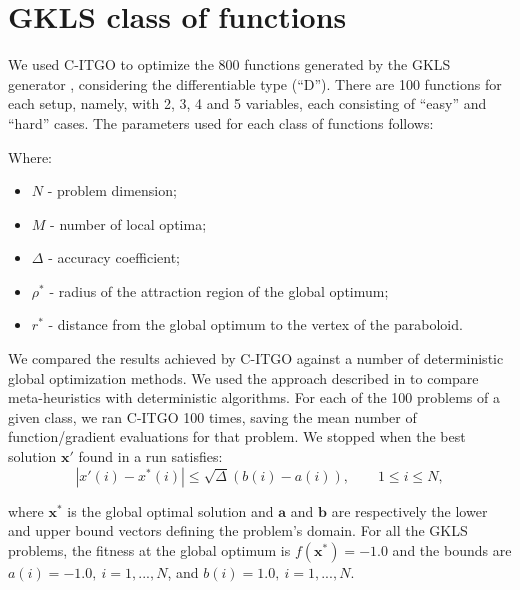 
\section*{GKLS class of functions}

We used C-ITGO to optimize the 800 functions generated by the GKLS generator \cite{GKLS}, considering the differentiable type (“D”). There are 100 functions for each setup, namely, with 2, 3, 4 and 5 variables, each consisting of “easy” and “hard” cases. The parameters used for each class of functions follows:





\noindent
Where:


\begin{itemize}

\item $N$ - problem dimension;
\item $M$ - number of local optima;
\item $\Delta$ - accuracy coefficient;
\item $\rho^*$ - radius of the attraction region of the global optimum;
\item $r^*$ - distance from the global optimum to the vertex of the paraboloid.

\end{itemize}


We compared the results achieved by C-ITGO against a number of deterministic global optimization methods. We used the approach described in \cite{NAT} to compare meta-heuristics with deterministic algorithms. For each of the 100 problems of a given class, we ran C-ITGO 100 times, saving the mean number of function/gradient evaluations for that problem. We stopped when the best solution $\bm{x}'$ found in a run satisfies:\\[-2.5em]

\begin{equation}\label{eq:Convergence}
    |x'(i) - x^*(i)| \leq \sqrt{\Delta}(b(i) - a(i)), \qquad 1 \leq i \leq N,
\end{equation}


\noindent
where $\bm{x}^*$ is the global optimal solution and $\bm{a}$ and $\bm{b}$ are respectively the lower and upper bound vectors defining the problem's domain. For all the GKLS problems, the fitness at the global optimum is $f(\bm{x}^*) = -1.0$ and the bounds are $a(i) = -1.0, \ i = 1, ..., N$, and $b(i) = 1.0, \ i = 1, ..., N$.


